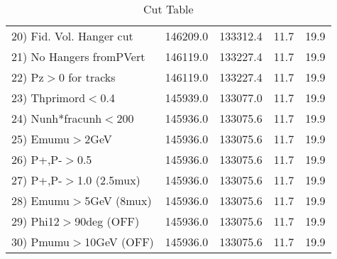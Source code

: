 \begin{table}[h!]
\begin{tabular}{||l||r|r|r|r||}
 20) Fid. Vol. Hanger cut &    146209.0 &    133312.4 &        11.7 &        19.9 \\
 21) No Hangers fromPVert &    146119.0 &    133227.4 &        11.7 &        19.9 \\
 22) Pz$>$0 for tracks    &    146119.0 &    133227.4 &        11.7 &        19.9 \\
 23) Thprimord$<$0.4      &    145939.0 &    133077.0 &        11.7 &        19.9 \\
 24) Nunh*fracunh$<$200   &    145936.0 &    133075.6 &        11.7 &        19.9 \\
 25) Emumu$>$2GeV         &    145936.0 &    133075.6 &        11.7 &        19.9 \\
 26) P+,P-$>$0.5          &    145936.0 &    133075.6 &        11.7 &        19.9 \\
 27) P+,P-$>$1.0 (2.5mux) &    145936.0 &    133075.6 &        11.7 &        19.9 \\
 28) Emumu$>$5GeV  (8mux) &    145936.0 &    133075.6 &        11.7 &        19.9 \\
 29) Phi12$>$90deg  (OFF) &    145936.0 &    133075.6 &        11.7 &        19.9 \\
 30) Pmumu$>$10GeV  (OFF) &    145936.0 &    133075.6 &        11.7 &        19.9 \\
 \hline
 \hline
 \end{tabular}
 \caption{Cut Table \cohjp  }
 \label{tab-cut__jpsi}
 \end{table}
